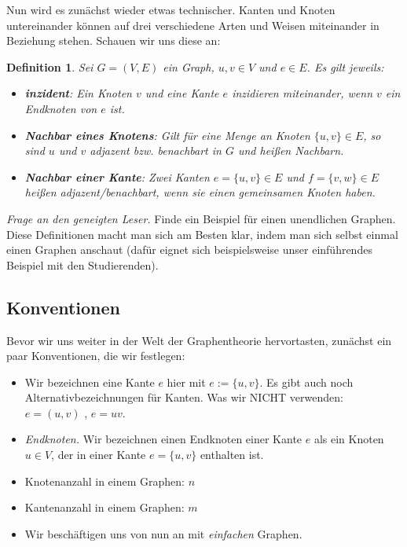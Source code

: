 \documentclass{article}
\newtheorem{definition}{Definition}
\theoremstyle{plain}
\begin{document}
\newpage
Nun wird es zunächst wieder etwas technischer. Kanten und Knoten untereinander können auf drei verschiedene Arten und Weisen miteinander in Beziehung stehen. Schauen wir uns diese an:\\
\begin{definition}
    Sei \(G = (V, E)\) ein Graph, \(u, v \in V\) und \(e \in E\).
    Es gilt jeweils:
    \begin{itemize}
        \item \textbf{inzident}:
            Ein Knoten \(v\) und eine Kante \(e\) \textit{inzidieren} miteinander, wenn \(v\) ein \textit{Endknoten} von \(e\) ist.
        \item \textbf{Nachbar eines Knotens}:
            Gilt für eine Menge an Knoten \(\{u, v\} \in E\), so sind \(u\) und \(v\) \textit{adjazent} bzw. \textit{benachbart} in \(G\) und heißen \textit{Nachbarn}.
        \item \textbf{Nachbar einer Kante}:
            Zwei Kanten \(e = \{u, v\} \in E\) und \(f = \{v, w\} \in E\) heißen \textit{adjazent/benachbart}, wenn sie einen gemeinsamen Knoten haben.
    \end{itemize}
\end{definition}
\bigskip
\emph{Frage an den geneigten Leser.} Finde ein Beispiel für einen unendlichen Graphen.
\bigskip
Diese Definitionen macht man sich am Besten klar, indem man sich selbst einmal einen Graphen anschaut (dafür eignet sich beispielsweise unser einführendes Beispiel mit den Studierenden).\\
\subsection{Konventionen}
Bevor wir uns weiter in der Welt der Graphentheorie hervortasten, zunächst ein paar Konventionen, die wir festlegen:
\begin{itemize}
        \item Wir bezeichnen eine  Kante \(e\) hier mit \(e:= \{u, v\}\). Es gibt auch noch Alternativbezeichnungen für Kanten. Was wir NICHT verwenden: \(e = (u, v)\) , \(e = uv\).
        \item \textit{Endknoten.} Wir bezeichnen einen Endknoten einer Kante \(e\) als ein Knoten \(u \in V\), der in einer Kante \(e = \{u, v\}\) enthalten ist. 
        \item Knotenanzahl in einem Graphen: \(n\)
        \item Kantenanzahl in einem Graphen: \(m\)
        \item Wir beschäftigen uns von nun an mit \textit{einfachen} Graphen.
    \end{itemize}
\end{document}
